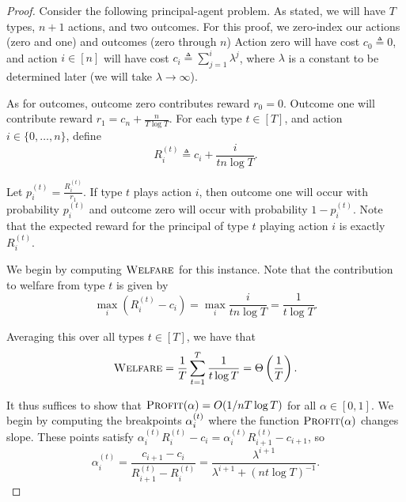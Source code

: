 \documentclass{article}
\newcommand{\Cost}[1]{c_{#1}}
\newcommand{\Reward}[1]{r_{#1}}
\newcommand{\TypedExpectedReward}[2]{R^{(#1)}_{#2}}
\newcommand{\TransferCoefficient}{\alpha}
\newcommand{\Profit}{\textsc{Profit}}
\newcommand{\OWelfare}{\textsc{Welfare}}
\begin{document}
\begin{proof}
Consider the following principal-agent problem. As stated, we will have $T$ types, $n+1$ actions, and two outcomes. For this proof, we zero-index our actions (zero and one) and outcomes (zero through $n$) Action zero will have cost $\Cost{0} \triangleq 0$, and action $i \in [n]$ will have cost $\Cost{i} \triangleq \sum_{j=1}^i \lambda^j$, where $\lambda$ is a constant to be determined later (we will take $\lambda \rightarrow \infty$).

As for outcomes, outcome zero contributes reward $\Reward{0} = 0$. Outcome one will contribute reward $\Reward{1} = \Cost{n} + \frac{n}{T \log T}$. For each type $t \in [T]$, and action $i \in \{0, \dots, n\}$, define
$$\TypedExpectedReward{t}{i} \triangleq \Cost{i} + \frac{i}{t n \log T}.$$

Let $p_{i}^{(t)} = \frac{\TypedExpectedReward{t}{i}}{\Reward{1}}$. If type $t$ plays action $i$, then outcome one will occur with probability $p_{i}^{(t)}$ and outcome zero will occur with probability $1-p_{i}^{(t)}$. Note that the expected reward for the principal of type $t$ playing action $i$ is exactly $\TypedExpectedReward{t}{i}$.

We begin by computing $\OWelfare$ for this instance. Note that the contribution to welfare from type $t$ is given by
$$\max_{i} (\TypedExpectedReward{t}{i} - \Cost{i}) = \max_{i} \frac{i}{t n \log T} = \frac{1}{t \log T}.$$

Averaging this over all types $t \in [T]$, we have that
$$ \OWelfare = \frac1T \sum_{t=1}^T \frac{1}{t\log T} = \Theta\left(\frac1T\right).$$

It thus suffices to show that $\Profit(\TransferCoefficient) = O(1 / n T \log T)$ for all $\TransferCoefficient \in [0, 1]$. We begin by computing the breakpoints $\TypedBreakpoint{t}{i}$ where the function $\Profit(\TransferCoefficient)$ changes slope. These points satisfy $\alpha_{i}^{(t)}R_{i}^{(t)} - c_{i} = \alpha_{i}^{(t)}R_{i+1}^{(t)} - c_{i+1}$, so
$$\alpha_{i}^{(t)} = \frac{c_{i+1} - c_{i}}{R_{i+1}^{(t)} - R_{i}^{(t)}} = \frac{\lambda^{i+1}}{\lambda^{i+1} + (nt\log T)^{-1}}.$$


\end{proof}
\end{document}
